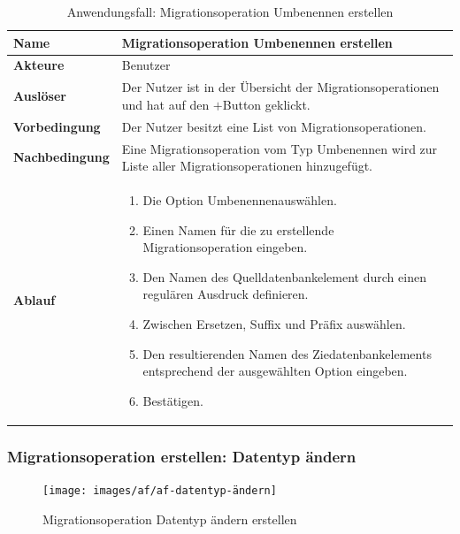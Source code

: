 \begin{table}[H]
	\centering
	\begin{tabular}{ |p{4cm}|p{8cm}| }
		\hline
		\textbf{Name} &  Migrationsoperation Umbenennen erstellen \\
		\hline
		\textbf{Akteure} & Benutzer \\
		\hline
		\textbf{Auslöser} & Der Nutzer ist in der Übersicht der Migrationsoperationen und hat auf den \glqq $+$\grqq Button geklickt. \\
		\hline
		\textbf{Vorbedingung} & Der Nutzer besitzt eine List von Migrationsoperationen.  \\
		\hline
		\textbf{Nachbedingung} & Eine Migrationsoperation vom Typ Umbenennen wird zur Liste aller Migrationsoperationen hinzugefügt.  \\
		\hline
		\textbf{Ablauf} & 
		\begin{enumerate}
			\item Die Option \glqq Umbenennen\grqq auswählen.
			\item Einen Namen für die zu erstellende Migrationsoperation eingeben.
			\item Den Namen des Quelldatenbankelement durch einen regulären Ausdruck definieren.
			\item Zwischen Ersetzen, Suffix und Präfix auswählen.
			\item Den resultierenden Namen des Ziedatenbankelements entsprechend der ausgewählten Option eingeben.
			\item Bestätigen.
		\end{enumerate}  \\
		\hline
		
	\end{tabular}
	\caption{Anwendungsfall: Migrationsoperation Umbenennen erstellen}
	\label{table:umbenennen}
\end{table}




\subsubsection{Migrationsoperation erstellen: Datentyp ändern }
\begin{figure}[H]
	\caption{Migrationsoperation \glqq Datentyp ändern \grqq erstellen}
	\centering
	\texttt{[image: images/af/af-datentyp-ändern]}
	\label{img:af-datentyp-ändern}
\end{figure}

